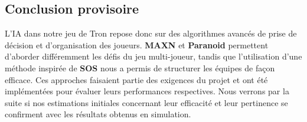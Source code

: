 \subsection{Conclusion provisoire}
L'IA dans notre jeu de Tron repose donc sur des algorithmes avancés de prise de décision et d'organisation des joueurs. \textbf{MAXN} et \textbf{Paranoid} permettent d'aborder différemment les défis du jeu multi-joueur, tandis que l'utilisation d'une méthode inspirée de \textbf{SOS} nous a permis de structurer les équipes de façon efficace.
Ces approches faisaient partie des exigences du projet et ont été implémentées pour évaluer leurs performances respectives. Nous verrons par la suite si nos estimations initiales concernant leur efficacité et leur pertinence se confirment avec les résultats obtenus en simulation.
